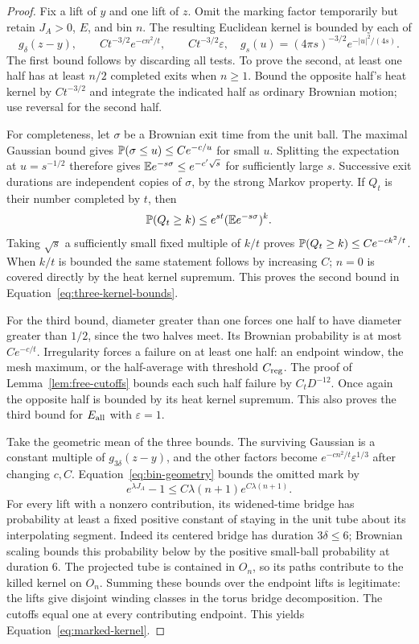 \begin{proof}
Fix a lift of $y$ and one lift of $z$.  Omit the marking
factor temporarily but retain $J_A>0$, $E$, and bin $n$.
The resulting Euclidean kernel is bounded by each of
\begin{equation}\label{eq:three-kernel-bounds}
 g_\delta(z-y),\qquad
 Ct^{-3/2}e^{-cn^2/t},\qquad
 Ct^{-3/2}\varepsilon,
 \quad
 g_s(u)=(4\pi s)^{-3/2}e^{-|u|^2/(4s)}.
\end{equation}
The first bound follows by discarding all tests.  To prove
the second, at least one half has at least $n/2$ completed
exits when $n\ge1$.  Bound the opposite half's heat kernel
by $Ct^{-3/2}$ and integrate the indicated half as ordinary
Brownian motion; use reversal for the second half.

For completeness, let $\sigma$ be a Brownian exit time
from the unit ball.  The maximal Gaussian bound gives
$\mathbb P(\sigma\le u)\le Ce^{-c/u}$ for small $u$.
Splitting the expectation at $u=s^{-1/2}$ therefore gives
$\mathbb E e^{-s\sigma}\le e^{-c'\sqrt s}$ for sufficiently
large $s$.  Successive exit durations are independent
copies of $\sigma$, by the strong Markov property.
If $Q_t$ is their number completed by $t$, then
\[
 \mathbb P(Q_t\ge k)\le e^{st}(\mathbb E e^{-s\sigma})^k.
\]
Taking $\sqrt s$ a sufficiently small fixed multiple of
$k/t$ proves $\mathbb P(Q_t\ge k)\le Ce^{-ck^2/t}$.
When $k/t$ is bounded the same statement follows by
increasing $C$; $n=0$ is covered directly by the heat
kernel supremum.  This proves the second bound in
Equation~\eqref{eq:three-kernel-bounds}.

For the third bound, diameter greater than one forces
one half to have diameter greater than $1/2$, since the
two halves meet.  Its Brownian probability is at most
$Ce^{-c/t}$.  Irregularity forces a failure on at least
one half: an endpoint window, the mesh maximum, or the
half-average with threshold $C_{\rm reg}$.  The proof of
Lemma~\ref{lem:free-cutoffs} bounds each such half failure
by $C_tD^{-12}$.  Once again the opposite half is bounded
by its heat kernel supremum.  This also proves the third
bound for $E_{\rm all}$ with $\varepsilon=1$.

Take the geometric mean of the three bounds.  The surviving
Gaussian is a constant multiple of $g_{3\delta}(z-y)$,
and the other factors become
$e^{-cn^2/t}\varepsilon^{1/3}$ after changing $c,C$.
Equation~\eqref{eq:bin-geometry} bounds the omitted mark by
\[
 e^{\lambda J_A}-1
 \le C\lambda(n+1)e^{C\lambda(n+1)}.
\]
For every lift with a nonzero contribution, its widened-time
bridge has probability at least a fixed positive constant
of staying in the unit tube about its interpolating segment.
Indeed its centered bridge has duration $3\delta\le6$;
Brownian scaling bounds this probability below by the
positive small-ball probability at duration $6$.
The projected tube is contained in $O_n$, so its paths
contribute to the killed kernel on $O_n$.  Summing these
bounds over the endpoint lifts is legitimate: the lifts
give disjoint winding classes in the torus bridge
decomposition.  The cutoffs equal one at every contributing
endpoint.  This yields Equation~\eqref{eq:marked-kernel}.
\end{proof}

